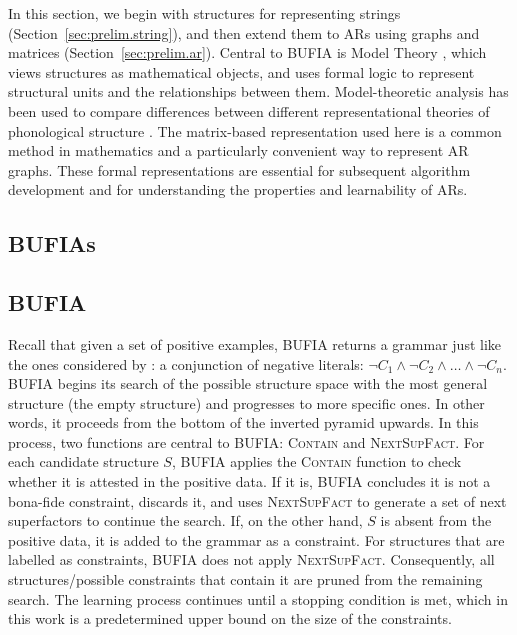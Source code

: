 In this section, we begin with structures for representing strings
(Section~\ref{sec:prelim.string}), and then extend them to ARs using
graphs and matrices (Section~\ref{sec:prelim.ar}). Central to BUFIA is
Model Theory \citep{enderton2001mathematical}, which views structures
as mathematical objects, and uses formal logic to represent structural
units and the relationships between them. Model-theoretic analysis has
been used to compare differences between different representational
theories of phonological structure
\citep{strother2017using
	oakdenNotationalEquivalenceTonal2020, jardineetal20qtheoryAP}.  
The matrix-based representation used here is a common method in
mathematics and a particularly convenient way to represent AR
graphs. These formal representations are essential for subsequent 
algorithm development and for understanding the properties and 
learnability of ARs.


\subsection{BUFIAs}

\subsection{BUFIA}\label{sec:prelim.bufia}

Recall that given a set of positive examples, BUFIA returns a grammar just like
the ones considered by \citet{jardine2017LocalNature}: a conjunction
of negative literals: $\lnot C_1 \land \lnot C_2 \land \ldots \land \lnot C_n$.
BUFIA begins its search of the possible structure space with the most
general structure (the empty structure) and progresses to more
specific ones. In other words, it proceeds from the bottom of the
inverted pyramid upwards. In this process, two functions are central 
to BUFIA: \textsc{Contain} and \textsc{NextSupFact}. For each 
candidate structure \(S\), BUFIA applies the
\textsc{Contain} function to check whether it is attested
in the positive data. If it is, BUFIA concludes it is not a bona-fide
constraint, discards it, and uses \textsc{NextSupFact} to generate a
set of next superfactors to continue the search. If, on the other
hand, \(S\) is absent from the positive data, it is added to the
grammar as a constraint. For structures that are labelled as constraints,
BUFIA does not apply \textsc{NextSupFact}. Consequently, all structures/possible 
constraints that contain it are pruned from the remaining search. The learning 
process continues until a stopping condition is met, which in this work is a
predetermined upper bound on the size of the constraints.

